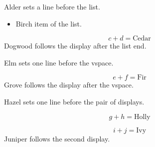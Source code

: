 \documentclass{article}
\begin{document}
Alder sets a line before the list.
\begin{itemize}
\item Birch item of the list.
\end{itemize}
\[ c + d = \text{Cedar} \]
Dogwood follows the display after the list end.

Elm sets one line before the vspace.

\vspace{12pt}

\[ e + f = \text{Fir} \]
Grove follows the display after the vspace.

Hazel sets one line before the pair of displays.

\[ g + h = \text{Holly} \]

\[ i + j = \text{Ivy} \]
Juniper follows the second display.
\end{document}
